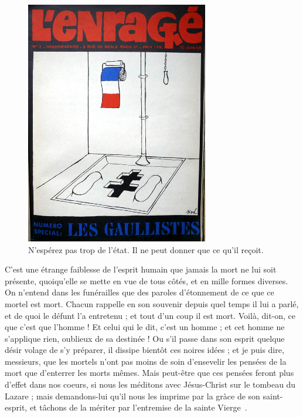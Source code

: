 \documentclass[a4paper,footinbib,final,openany,final,12pt]{book}
\begin{document}
\begin{figure}[!htb]
\begin{center}
\includegraphics[width=8cm]{Fig01}
\caption{N'esp{\'{e}}rez pas trop de l'{\'{e}}tat. Il ne peut donner que ce qu'il re{\c{c}}oit.}
\label{Fig1}
\end{center}
\end{figure}

C'est une {\'{e}}trange faiblesse de l'esprit humain que jamais la mort ne lui soit pr{\'{e}}sente, quoiqu'elle se mette en vue de tous c{\^{o}}t{\'{e}}s, et en mille formes diverses. On n'entend dans les fun{\'{e}}railles que des paroles d'{\'{e}}tonnement de ce que ce mortel est mort. Chacun rappelle en son souvenir depuis quel temps il lui a parl{\'{e}}, et de quoi le d{\'{e}}funt l'a entretenu ; et tout d'un coup il est mort. Voil{\`{a}}, dit-on, ce que c'est que l'homme ! Et celui qui le dit, c'est un homme ; et cet homme ne s'applique rien, oublieux de sa destin{\'{e}}e ! Ou s'il passe dans son esprit quelque d{\'{e}}sir volage de s'y pr{\'{e}}parer, il dissipe bient{\^{o}}t ces noires id{\'{e}}es ; et je puis dire, messieurs, que les mortels n'ont pas moins de soin d'ensevelir les pens{\'{e}}es de la mort que d'enterrer les morts m{\^{e}}mes. Mais peut-{\^{e}}tre que ces pens{\'{e}}es feront plus d'effet dans nos coeurs, si nous les m{\'{e}}ditons avec J{\'{e}}sus-Christ sur le tombeau du Lazare ; mais demandons-lui qu'il nous les imprime par la gr{\`{a}}ce de son saint-esprit, et t{\^{a}}chons de la m{\'{e}}riter par l'entremise de la sainte Vierge~\cite{Efforts,Communiste}.
				
\end{document}
